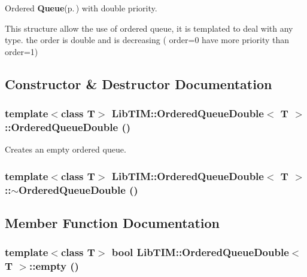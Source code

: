 Ordered {\bf Queue}{\rm (p.\,\pageref{classLibTIM_1_1Queue})} with double priority. 

This structure allow the use of ordered queue, it is templated to deal with any type. the order is double and is decreasing ( order=0 have more priority than order=1)



\subsection{Constructor \& Destructor Documentation}
\subsubsection{\setlength{\rightskip}{0pt plus 5cm}template$<$class T$>$ {\bf Lib\-TIM::Ordered\-Queue\-Double}$<$ T $>$::{\bf Ordered\-Queue\-Double} ()\hspace{0.3cm}{\tt  [inline]}}\label{classLibTIM_1_1OrderedQueueDouble_a0}


Creates an empty ordered queue. 

\subsubsection{\setlength{\rightskip}{0pt plus 5cm}template$<$class T$>$ {\bf Lib\-TIM::Ordered\-Queue\-Double}$<$ T $>$::$\sim${\bf Ordered\-Queue\-Double} ()\hspace{0.3cm}{\tt  [inline]}}\label{classLibTIM_1_1OrderedQueueDouble_a1}




\subsection{Member Function Documentation}
\subsubsection{\setlength{\rightskip}{0pt plus 5cm}template$<$class T$>$ bool {\bf Lib\-TIM::Ordered\-Queue\-Double}$<$ T $>$::empty ()\hspace{0.3cm}{\tt  [inline]}}\label{classLibTIM_1_1OrderedQueueDouble_a4}



